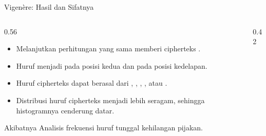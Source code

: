 \documentclass[aspectratio=169,11pt]{beamer}
\begin{document}
\begin{frame}{Vigen\`ere: Hasil dan Sifatnya}
    \begin{columns}[T,onlytextwidth]
        \begin{column}{0.56\textwidth}
            \footnotesize
            \begin{itemize}
                \item Melanjutkan perhitungan yang sama memberi cipherteks
                      .
                \item Huruf  menjadi  pada posisi kedua dan
                       pada posisi kedelapan.
                \item Huruf cipherteks  dapat berasal dari ,
                      , , , atau .
                \item Distribusi huruf cipherteks menjadi lebih seragam,
                      sehingga histogramnya cenderung datar.
            \end{itemize}
            \begin{alertblock}{Akibatnya}
                \footnotesize
                Analisis frekuensi huruf tunggal kehilangan pijakan.
            \end{alertblock}
        \end{column}
        \begin{column}{0.42\textwidth}
            \centering
        \end{column}
    \end{columns}
\end{frame}
\end{document}
